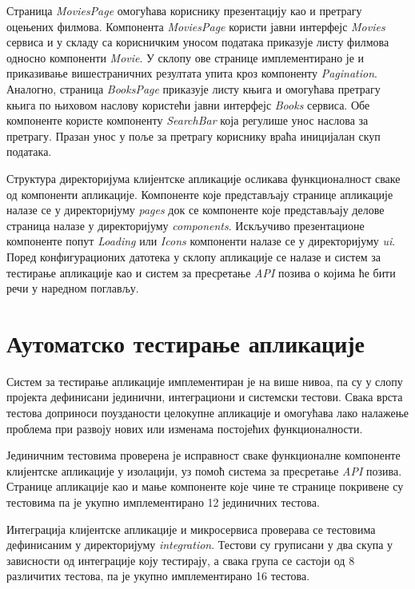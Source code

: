 \documentclass[12pt,oneside]{memoir}
\begin{document}
Страница \textit{MoviesPage} омогућава кориснику презентацију као и претрагу оцењених филмова. Компонента  \textit{MoviesPage} користи јавни интерфејс \textit{Movies} сервиса и у складу са корисничким уносом података приказује листу филмова односно компоненти \textit{Movie}.  У склопу ове странице имплементирано је и приказивање вишестраничних резултата упита кроз компоненту \textit{Pagination}. Аналогно, страница \textit{BooksPage} приказује листу књига и омогућава претрагу књига по њиховом наслову користећи јавни интерфејс \textit{Books} сервиса. Обе компоненте користе компоненту \textit{SearchBar} која регулише унос наслова за претрагу. Празан унос у поље за претрагу кориснику враћа иницијалан скуп података.

Структура директоријума клијентске апликације осликава функционалност сваке од компоненти апликације. Компоненте које представљају странице апликације налазе се у директоријуму \textit{pages} док се компоненте које представљају делове страница налазе у директоријуму \textit{components}. Искључиво презентационе компоненте попут \textit{Loading} или \textit{Icons} компоненти налазе се у директоријуму \textit{ui}. Поред конфигурационих датотека у склопу апликације се налазе и систем за тестирање апликације као и систем за пресретање \textit{API} позива о којима ће бити речи у наредном поглављу.



\section{Аутоматско тестирање апликације}

Систем за тестирање апликације имплементиран је на више нивоа, па су у слопу пројекта дефинисани јединични, интеграциони и системски тестови. Свака врста тестова доприноси поузданости целокупне апликације и омогућава лако налажење проблема при развоју нових или изменама постојећих функционалности.

Јединичним тестовима проверена је исправност сваке функционалне компоненте клијентске апликације у изолацији, уз помоћ система за пресретање \textit{API} позива. Странице апликације као и мање компоненте које чине те странице покривене су тестовима па је укупно имплементирано 12 јединичних тестова.

Интеграција клијентске апликације и микросервиса проверава се тестовима дефинисаним у директоријуму \textit{integration}. Тестови су груписани у два скупа у зависности од интеграције коју тестирају, а свака група се састоји од 8 различитих тестова, па је укупно имплементирано 16 тестова.
\end{document}
